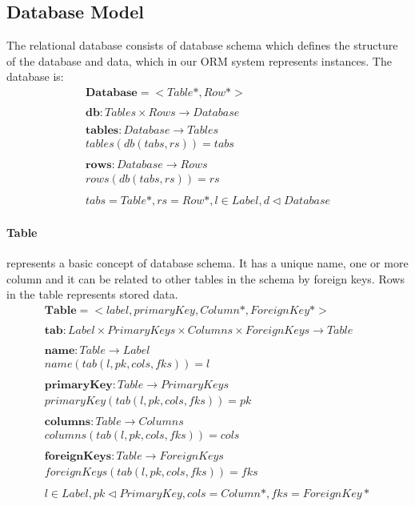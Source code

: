 \documentclass[11pt]{article}
\begin{document}
\subsection{Database Model}
\label{sec:dbModel}
The relational database consists of database schema which defines the structure of the database and data, which in our ORM system represents instances. The database is:
\begin{align*}
	\mathbf{Database} = < Table*, Row*> \\ \\
	\mathbf{db} : Tables \times Rows \rightarrow Database \\ \\
	\mathbf{tables} : Database \rightarrow Tables \\
	tables(db(tabs, rs)) = tabs \\ \\
	\mathbf{rows} : Database \rightarrow Rows \\
	rows(db(tabs, rs)) = rs \\ \\
	tabs = Table*, rs = Row*, l \in Label,d \lhd Database
\end{align*}
\paragraph{Table} represents a basic concept of database schema. It has a unique name, one or more column and it can be related to other tables in the schema by foreign keys. Rows in the table represents stored data.
\begin{align*}
	\mathbf{Table} = <label, primaryKey, Column*, ForeignKey*>\\ \\
	\mathbf{tab} 	: Label \times PrimaryKeys \times Columns \times ForeignKeys \rightarrow Table \\ \\
	\mathbf{name} : Table \rightarrow Label  \\
	name(tab(l, pk, cols, fks)) = l \\ \\
	\mathbf{primaryKey} : Table \rightarrow PrimaryKeys  \\
	primaryKey(tab(l, pk, cols, fks)) = pk \\ \\
	\mathbf{columns} : Table \rightarrow Columns  \\
	columns(tab(l, pk, cols, fks)) = cols \\ \\
	\mathbf{foreignKeys} : Table \rightarrow ForeignKeys  \\
	foreignKeys(tab(l, pk, cols, fks)) = fks \\ \\
l \in Label, pk \lhd PrimaryKey, cols = Column*, fks = ForeignKey*
\end{align*}
\end{document}
